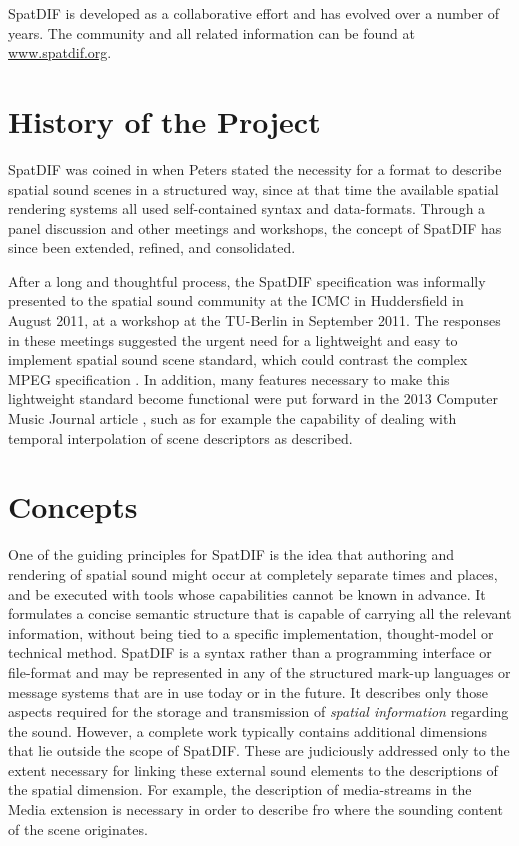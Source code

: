 \documentclass[a4paper]{article}
\begin{document}
SpatDIF is developed as a collaborative effort and has evolved over a number of years. 
The community and all related information can be found at \url{www.spatdif.org}.

\section{History of the Project} %
SpatDIF was coined in \citeyear{peters_caa07} \cite{peters_caa07} when Peters stated the necessity for a format to describe spatial sound scenes in a structured way, since at that time the available spatial rendering systems all used self-contained syntax and data-formats. 
Through a panel discussion \cite{2008ICMCpanel, Peters:2008spatdif} and other meetings and workshops, the concept of SpatDIF has since been extended, refined, and consolidated. 

After a long and thoughtful process, the SpatDIF specification was informally presented to the spatial sound community at the ICMC in Huddersfield in August 2011, at a workshop at the TU-Berlin in September 2011.
The responses in these meetings suggested the urgent need for a lightweight and easy to implement spatial sound scene standard, which could contrast the complex MPEG specification \cite{scheirer1999audiobifs}.  
In addition, many features necessary to make this lightweight standard become functional were put forward in the 2013 Computer Music Journal article \cite{Peters:2013SpatDifCMJ}, such as for example the capability of dealing with temporal interpolation of scene descriptors as described.

\section{Concepts} %

One of the guiding principles for SpatDIF is the idea that authoring and rendering of spatial sound might occur at completely separate times and places, and be executed with tools whose capabilities cannot be known in advance. 
It formulates a concise semantic structure that is capable of carrying all the relevant information, without being tied to a specific implementation, thought-model or technical method. 
SpatDIF is a syntax rather than a programming interface or file-format and may be represented in any of the structured mark-up languages or message systems that are in use today or in the future. 
It describes only those aspects required for the storage and transmission of \emph{spatial information} regarding the sound.
However, a complete work typically contains additional dimensions that lie outside the scope of SpatDIF. 
These are judiciously addressed only to the extent necessary for linking these external sound elements to the descriptions of the spatial dimension. For example, the description of media-streams in the Media extension is necessary in order to describe fro where the sounding content of the scene originates.
\end{document}

